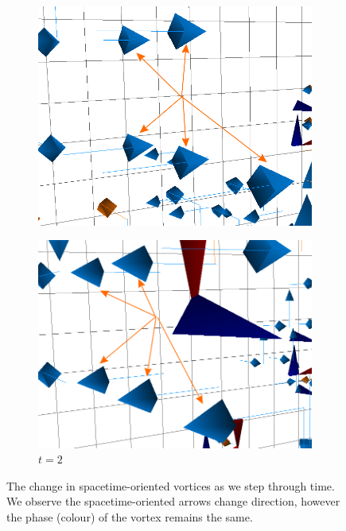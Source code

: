 \begin{figure}[htb!]
\centering
\begin{subfigure}[b]{0.45\textwidth}
\centering
\includegraphics[height=0.2\textheight]{./plaqlinet1_forwardarrows.png}
\end{subfigure}
\hfill
\begin{subfigure}[b]{0.45\textwidth}
\centering
\includegraphics[height=0.2\textheight]{./plaqlinet2_backwardarrows.png}
\caption{\label{fig:VortexArrows2}$t=2$}
\end{subfigure}
\caption[The change in spacetime-oriented vortices as we step through time.]{\label{fig:VortexArrows}The change in spacetime-oriented vortices as we step through time. We observe the spacetime-oriented arrows change direction, however the phase (colour) of the vortex remains the same.}
\end{figure}
